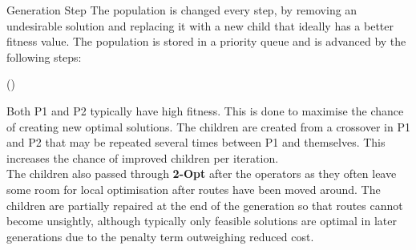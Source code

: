 \documentclass[ %
                    author={Callum Mann},
                     title={Genetic algorithm for the CVRP},
                  subtitle={Capacitated Vehicle Routing Problem},
                      type={Heuristic},
                      year={2016}]{poster}
\begin{document}
\begin{frame}{}
\begin{columns}[t]
\begin{column}{0.422\linewidth}
    \vfill

    \begin{block}{\Large Generation Step}
      The population is changed every step, by removing an undesirable solution and
      replacing it with a new child that ideally has a better fitness value. The population
      is stored in a priority queue and is advanced by the following steps:


      \begin{minipage}{20cm}
        \begin{algorithm}[H]
          \LinesNumbered
          \Fn(){\Fgst{}}{
          }
        \end{algorithm}
      \end{minipage}
      \vspace{1cm}

      Both P1 and P2 typically have high fitness.
      This is done to maximise the chance of creating new optimal solutions. The children
      are created from a crossover in P1 and P2 that may be repeated several times between
      P1 and themselves. This increases the chance of improved children per iteration.
      \vspace{1cm} \\
      The children also passed through \textbf{2-Opt} after the operators as
      they often leave some room for local optimisation after routes have been
      moved around. The children are partially repaired at the end of the generation
      so that routes cannot become unsightly,
      although typically only feasible solutions are optimal in later generations
      due to the penalty term outweighing reduced cost.

    \end{block}
    \vspace{1cm}


\end{column}
\end{columns}
\end{frame}
\end{document}
